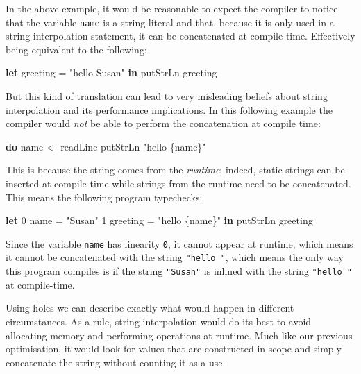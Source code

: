 \documentclass[
]{article}
\newenvironment{Shaded}{}{}
\newcommand{\DecValTok}[1]{\textcolor[rgb]{0.25,0.63,0.44}{#1}}
\newcommand{\FunctionTok}[1]{\textcolor[rgb]{0.02,0.16,0.49}{#1}}
\newcommand{\KeywordTok}[1]{\textcolor[rgb]{0.00,0.44,0.13}{\textbf{#1}}}
\newcommand{\NormalTok}[1]{#1}
\newcommand{\OtherTok}[1]{\textcolor[rgb]{0.00,0.44,0.13}{#1}}
\newcommand{\StringTok}[1]{\textcolor[rgb]{0.25,0.44,0.63}{#1}}
\begin{document}
In the above example, it would be reasonable to expect the compiler to
notice that the variable \texttt{name} is a string literal and that,
because it is only used in a string interpolation statement, it can be
concatenated at compile time. Effectively being equivalent to the
following:

\begin{Shaded}
\begin{Highlighting}[]
\KeywordTok{let}\NormalTok{ greeting }\OtherTok{=} \StringTok{"hello Susan"} \KeywordTok{in} 
    \FunctionTok{putStrLn}\NormalTok{ greeting}
\end{Highlighting}
\end{Shaded}

But this kind of translation can lead to very misleading beliefs about
string interpolation and its performance implications. In this following
example the compiler would \emph{not} be able to perform the
concatenation at compile time:

\begin{Shaded}
\begin{Highlighting}[]
\KeywordTok{do}\NormalTok{ name }\OtherTok{\textless{}{-}}\NormalTok{ readLine}
   \FunctionTok{putStrLn} \StringTok{"hello \{name\}"}
\end{Highlighting}
\end{Shaded}

This is because the string comes from the \emph{runtime}; indeed, static
strings can be inserted at compile-time while strings from the runtime
need to be concatenated. This means the following program typechecks:

\begin{Shaded}
\begin{Highlighting}[]
\KeywordTok{let} \DecValTok{0}\NormalTok{ name }\OtherTok{=} \StringTok{"Susan"} 
    \DecValTok{1}\NormalTok{ greeting }\OtherTok{=} \StringTok{"hello \{name\}"} \KeywordTok{in}
    \FunctionTok{putStrLn}\NormalTok{ greeting}
\end{Highlighting}
\end{Shaded}

Since the variable \texttt{name} has linearity \texttt{0}, it cannot
appear at runtime, which means it cannot be concatenated with the string
\texttt{"hello\ "}, which means the only way this program compiles is if
the string \texttt{"Susan"} is inlined with the string
\texttt{"hello\ "} at compile-time.

Using holes we can describe exactly what would happen in different
circumstances. As a rule, string interpolation would do its best to
avoid allocating memory and performing operations at runtime. Much like
our previous optimisation, it would look for values that are constructed
in scope and simply concatenate the string without counting it as a use.
\end{document}
